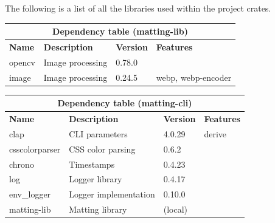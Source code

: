 \documentclass[a4paper]{article}
\begin{document}
The following is a list of all the libraries used within the project
crates.

\bgroup{}
\def\arraystretch{1.5}
\begin{center}
    \begin{tabular}{ |p{2cm}|p{4cm}|p{1.5cm}|p{2cm}| }
        \hline
        \multicolumn{4}{|c|}{\textbf{Dependency table (matting-lib)}} \\
        \hline
        \textbf{Name} & \textbf{Description} & \textbf{Version} & \textbf{Features} \\
        \hline
        opencv & Image processing & 0.78.0 & \- \\
        \hline
        image & Image processing & 0.24.5 & webp, webp-encoder \\
        \hline
    \end{tabular}
\end{center}
\egroup{}

\bgroup{}
\def\arraystretch{1.5}
\begin{center}
    \begin{tabular}{ |p{2cm}|p{4cm}|p{1.5cm}|p{2cm}| }
        \hline
        \multicolumn{4}{|c|}{\textbf{Dependency table (matting-cli)}} \\
        \hline
        \textbf{Name} & \textbf{Description} & \textbf{Version} & \textbf{Features} \\
        \hline
        clap & CLI parameters & 4.0.29 & derive \\
        \hline
        csscolorparser & CSS color parsing & 0.6.2 & \- \\
        \hline
        chrono & Timestamps & 0.4.23 & \- \\
        \hline
        log & Logger library & 0.4.17 & \- \\
        \hline
        env\_logger & Logger implementation & 0.10.0 & \- \\
        \hline
        matting-lib & Matting library & (local) & \- \\
        \hline
    \end{tabular}
\end{center}
\egroup{}
\end{document}
